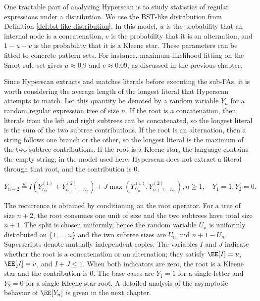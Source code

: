 One tractable part of analyzing Hyperscan is to study statistics of regular expressions under a distribution. We use the BST-like distribution from Definition \ref{def:bst-like-distribution}. In this model, $u$ is the probability that an internal node is a concatenation, $v$ is the probability that it is an alternation, and $1-u-v$ is the probability that it is a Kleene star. These parameters can be fitted to concrete pattern sets. For instance, maximum-likelihood fitting on the Snort rule set gives $u \approx 0.9$ and $v \approx 0.09$, as discussed in the previous chapter.

Since Hyperscan extracts and matches literals before executing the sub-FAs, it is worth considering the average length of the longest literal that Hyperscan attempts to match. Let this quantity be denoted by a random variable $Y_n$ for a random regular expression tree of size $n$. If the root is a concatenation, then literals from the left and right subtrees can be concatenated, so the longest literal is the sum of the two subtree contributions. If the root is an alternation, then a string follows one branch or the other, so the longest literal is the maximum of the two subtree contributions. If the root is a Kleene star, the language contains the empty string; in the model used here, Hyperscan does not extract a literal through that root, and the contribution is $0$.


\begin{equation}
  \label{eq:longest-literal-recurrence}
  Y_{n+2} \stackrel{d}{=} I\left(Y_{U_n}^{(1)} + Y_{n+1-U_n}^{(2)}\right) + J\max\left(Y_{U_n}^{(1)}, Y_{n+1-U_n}^{(2)}\right), n\ge 1, \quad Y_1=1, Y_2=0.
\end{equation}

The recurrence is obtained by conditioning on the root operator. For a tree of size $n+2$, the root consumes one unit of size and the two subtrees have total size $n+1$. The split is chosen uniformly, hence the random variable $U_n$ is uniformly distributed on $\{1, \ldots, n\}$ and the two subtree sizes are $U_n$ and $n+1-U_n$. Superscripts denote mutually independent copies. The variables $I$ and $J$ indicate whether the root is a concatenation or an alternation; they satisfy $\EE[I]=u$, $\EE[J]=v$, and $I+J\le1$. When both indicators are zero, the root is a Kleene star and the contribution is $0$. The base cases are $Y_1=1$ for a single letter and $Y_2=0$ for a single Kleene-star root. A detailed analysis of the asymptotic behavior of $\EE[Y_n]$ is given in the next chapter.
